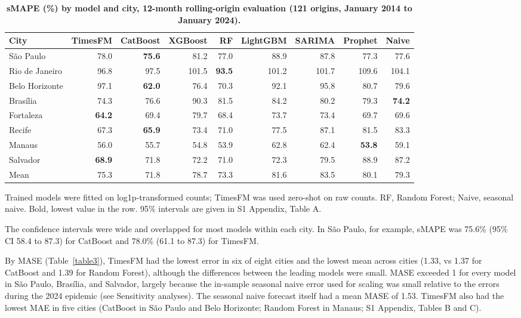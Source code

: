 \documentclass[10pt,letterpaper]{article}
\begin{document}

\begin{table}[!ht]
\centering
\small
\caption{\textbf{sMAPE (\%) by model and city, 12-month rolling-origin evaluation (121 origins, January 2014 to January 2024).}}
\begin{tabular}{lrrrrrrrr}
\toprule
City & TimesFM & CatBoost & XGBoost & RF & LightGBM & SARIMA & Prophet & Naive \\
\midrule
S\~ao Paulo & 78.0 & \textbf{75.6} & 81.2 & 77.0 & 88.9 & 87.8 & 77.3 & 77.6 \\
Rio de Janeiro & 96.8 & 97.5 & 101.5 & \textbf{93.5} & 101.2 & 101.7 & 109.6 & 104.1 \\
Belo Horizonte & 97.1 & \textbf{62.0} & 76.4 & 70.3 & 92.1 & 95.8 & 80.7 & 79.6 \\
Bras\'ilia & 74.3 & 76.6 & 90.3 & 81.5 & 84.2 & 80.2 & 79.3 & \textbf{74.2} \\
Fortaleza & \textbf{64.2} & 69.4 & 79.7 & 68.4 & 73.7 & 73.4 & 69.7 & 69.6 \\
Recife & 67.3 & \textbf{65.9} & 73.4 & 71.0 & 77.5 & 87.1 & 81.5 & 83.3 \\
Manaus & 56.0 & 55.7 & 54.8 & 53.9 & 62.8 & 62.4 & \textbf{53.8} & 59.1 \\
Salvador & \textbf{68.9} & 71.8 & 72.2 & 71.0 & 72.3 & 79.5 & 88.9 & 87.2 \\
\midrule
Mean & 75.3 & 71.8 & 78.7 & 73.3 & 81.6 & 83.5 & 80.1 & 79.3 \\
\bottomrule
\end{tabular}
\begin{flushleft} Trained models were fitted on log1p-transformed counts; TimesFM was used zero-shot on raw counts. RF, Random Forest; Naive, seasonal naive. Bold, lowest value in the row. 95\% intervals are given in S1 Appendix, Table A.
\end{flushleft}
\label{table2}
\end{table}


The confidence intervals were wide and overlapped for most models within each city. In S\~ao Paulo, for example, sMAPE was 75.6\% (95\% CI 58.4 to 87.3) for CatBoost and 78.0\% (61.1 to 87.3) for TimesFM.

By MASE (Table~\ref{table3}), TimesFM had the lowest error in six of eight cities and the lowest mean across cities (1.33, vs 1.37 for CatBoost and 1.39 for Random Forest), although the differences between the leading models were small. MASE exceeded 1 for every model in S\~ao Paulo, Bras\'ilia, and Salvador, largely because the in-sample seasonal naive error used for scaling was small relative to the errors during the 2024 epidemic (see Sensitivity analyses). The seasonal naive forecast itself had a mean MASE of 1.53. TimesFM also had the lowest MAE in five cities (CatBoost in S\~ao Paulo and Belo Horizonte; Random Forest in Manaus; S1 Appendix, Tables B and C).
\end{document}
